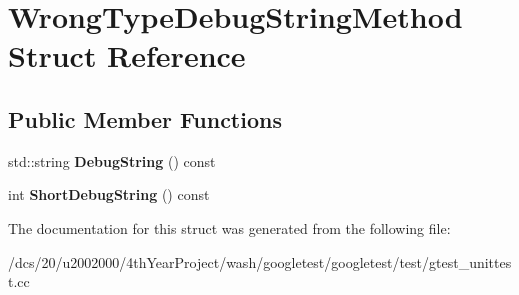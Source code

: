 \hypertarget{structWrongTypeDebugStringMethod}{}\section{Wrong\+Type\+Debug\+String\+Method Struct Reference}
\label{structWrongTypeDebugStringMethod}
\subsection*{Public Member Functions}
\begin{DoxyCompactItemize}
\item 
\mbox{\label{structWrongTypeDebugStringMethod_ae0dc68632d9e896c732bdb5387a3f6ff}} 
std\+::string {\bfseries Debug\+String} () const
\item 
\mbox{\label{structWrongTypeDebugStringMethod_a438ea364be98e6fc1a001acf17880165}} 
int {\bfseries Short\+Debug\+String} () const
\end{DoxyCompactItemize}


The documentation for this struct was generated from the following file\+:\begin{DoxyCompactItemize}
\item 
/dcs/20/u2002000/4th\+Year\+Project/wash/googletest/googletest/test/gtest\+\_\+unittest.\+cc\end{DoxyCompactItemize}
